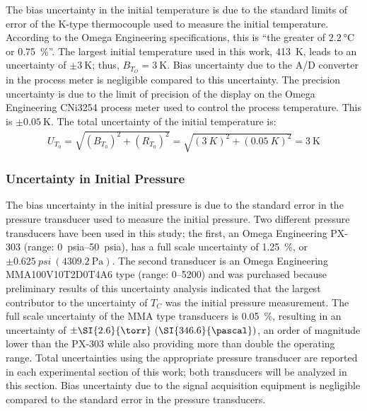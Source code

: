 \documentclass[../main.tex]{subfiles}
\begin{document}
The bias uncertainty in the initial temperature is due to the standard
limits of error of the K-type thermocouple used to measure the
initial temperature. According to the Omega Engineering
specifications, this is ``the greater
of $\SI{2.2}{\degreeCelsius}$ or \SI{0.75}{\percent}''. The largest initial temperature
used in this work, \SI{413}{\kelvin}, leads to an uncertainty of
$\pm \SI{3}{\kelvin}$; thus, $B_{T_O}=\SI{3}{\kelvin}$. Bias uncertainty
due to the A/D converter in the process meter is negligible compared
to this uncertainty.
The precision uncertainty is due to the limit of precision of
the display on the Omega Engineering CNi3254 process meter used
to control the process temperature. This is $\pm\SI{0.05}{\kelvin}$.
The total uncertainty of the initial temperature is:
%
\begin{align}
U_{T_0} = \sqrt{\left(B_{T_0}\right)^2 + \left(R_{T_0}\right)^2} = \sqrt{\left(\SI{3}{K}\right)^2 + \left(\SI{0.05}{K}\right)^2} = \SI{3}{\kelvin}
\end{align}

\subsubsection{Uncertainty in Initial Pressure}
\label{sec:unc-p0}

The bias uncertainty in the initial pressure is due to the
standard error in the pressure transducer used to measure
the initial pressure. Two different pressure transducers have
been used in this study; the first, an Omega Engineering PX-303
(range: \SIrange{0}{50}{psia}), has a full scale uncertainty of \SI{1.25}{\percent}, or
$\pm \SI{0.625}{psi} \ (\SI{4309.2}{\pascal})$. The second transducer is an
Omega Engineering MMA100V10T2D0T4A6 type (range: \SIrange{0}{5200}{\torr}) and was
purchased because preliminary results of this uncertainty analysis
indicated that the largest contributor to the uncertainty of $T_C$ was
the initial pressure measurement. The full scale uncertainty of the MMA
type transducers is \SI{0.05}{\percent}, resulting in an uncertainty of
$\pm \SI{2.6}{\torr} \ (\SI{346.6}{\pascal})$, an order of magnitude lower than
the PX-303 while also providing more than double the operating range. Total
uncertainties using the appropriate pressure transducer are reported in
each experimental section of this work; both transducers will be analyzed
in this section. Bias uncertainty due to the signal acquisition equipment
is negligible compared to the standard error in the pressure transducers.
\end{document}
